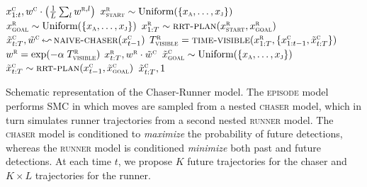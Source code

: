 \documentclass{article}
\newcommand{\eval}{\,\reflectbox{$\leadsto$}\:}
\begin{document}
\begin{algorithm}[!t]
\begin{algorithmic}[1]
    \State \Return $x^\textsc{c}_{1:t}, w^\textsc{c} \cdot \left(\frac{1}{L} \sum_{l} w^{\textsc{r},l}\right)$
\EndQuery
{} 
    \State $x^\textsc{r}_\textsc{start} \sim \text{Uniform}(\{x_\textsc{a},\ldots,x_\textsc{j}\})$
    \State $x^\textsc{r}_\textsc{goal} \sim \text{Uniform}(\{x_\textsc{a},\ldots,x_\textsc{j}\})$
    \State $x^\textsc{r}_{1:T} \sim \Call{rrt-plan}{x^\textsc{r}_\textsc{start}, x^\textsc{r}_\textsc{goal}}$
    \State $\tilde{x}^\textsc{c}_{t:T}, \tilde{w}^\textsc{c} \eval \textsc{naive-chaser}(x^\textsc{c}_{t-1})$
    \State $T^\textsc{r}_\textsc{visible} = \Call{time-visible}{x^\textsc{r}_{1:T}, \{x^\textsc{c}_{1:t-1}, \tilde{x}^\textsc{c}_{t:T}\}}$
    \State $w^\textsc{r} = \exp(-\alpha \; T^\textsc{r}_\textsc{visible})$
    \State \Return $x^\textsc{r}_{t:T},  w^\textsc{r} \cdot \tilde{w}^\textsc{c}$
\EndQuery
{} 
    \State $\tilde{x}^\textsc{c}_\textsc{goal} \sim \text{Uniform}(\{x_\textsc{a},\ldots,x_\textsc{j}\})$
    \State $\tilde{x}^\textsc{c}_{t:T} \sim \Call{rrt-plan}{x^\textsc{c}_{t-1}, \tilde{x}^\textsc{c}_\textsc{goal}}$ 
    \State \Return $\tilde{x}^\textsc{c}_{t:T}, 1$
\EndQuery
\end{algorithmic}

\caption{
\label{alg:chaser-runner-programs}
Schematic representation of the Chaser-Runner model. The \textsc{episode} model performs SMC in which moves are sampled from a nested \textsc{chaser} model, which in turn simulates runner trajectories from a second nested \textsc{runner} model. The \textsc{chaser} model is conditioned to \emph{maximize} the probability of future detections, whereas the \textsc{runner} model is conditioned \emph{minimize} both past and future detections. At each time $t$, we propose $K$ future trajectories for the chaser and $K \times L$ trajectories for the runner.} %
\end{algorithm}
\end{document}
